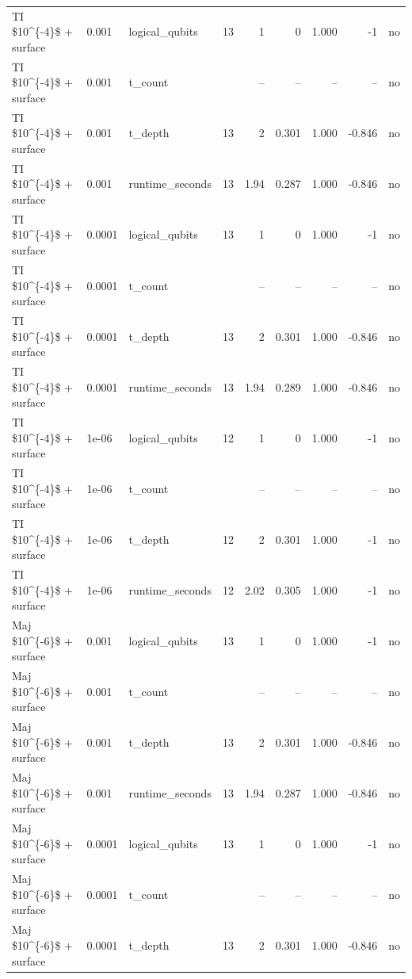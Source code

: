 \begin{tabular}{lllrrrrrl}
TI \$10\textasciicircum{}\{-4\}\$ + surface & 0.001 & logical\_qubits & 13 & 1 & 0 & 1.000 & -1 & no \\
TI \$10\textasciicircum{}\{-4\}\$ + surface & 0.001 & t\_count &  & -- & -- & -- & -- & no \\
TI \$10\textasciicircum{}\{-4\}\$ + surface & 0.001 & t\_depth & 13 & 2 & 0.301 & 1.000 & -0.846 & no \\
TI \$10\textasciicircum{}\{-4\}\$ + surface & 0.001 & runtime\_seconds & 13 & 1.94 & 0.287 & 1.000 & -0.846 & no \\
TI \$10\textasciicircum{}\{-4\}\$ + surface & 0.0001 & logical\_qubits & 13 & 1 & 0 & 1.000 & -1 & no \\
TI \$10\textasciicircum{}\{-4\}\$ + surface & 0.0001 & t\_count &  & -- & -- & -- & -- & no \\
TI \$10\textasciicircum{}\{-4\}\$ + surface & 0.0001 & t\_depth & 13 & 2 & 0.301 & 1.000 & -0.846 & no \\
TI \$10\textasciicircum{}\{-4\}\$ + surface & 0.0001 & runtime\_seconds & 13 & 1.94 & 0.289 & 1.000 & -0.846 & no \\
TI \$10\textasciicircum{}\{-4\}\$ + surface & 1e-06 & logical\_qubits & 12 & 1 & 0 & 1.000 & -1 & no \\
TI \$10\textasciicircum{}\{-4\}\$ + surface & 1e-06 & t\_count &  & -- & -- & -- & -- & no \\
TI \$10\textasciicircum{}\{-4\}\$ + surface & 1e-06 & t\_depth & 12 & 2 & 0.301 & 1.000 & -1 & no \\
TI \$10\textasciicircum{}\{-4\}\$ + surface & 1e-06 & runtime\_seconds & 12 & 2.02 & 0.305 & 1.000 & -1 & no \\
Maj \$10\textasciicircum{}\{-6\}\$ + surface & 0.001 & logical\_qubits & 13 & 1 & 0 & 1.000 & -1 & no \\
Maj \$10\textasciicircum{}\{-6\}\$ + surface & 0.001 & t\_count &  & -- & -- & -- & -- & no \\
Maj \$10\textasciicircum{}\{-6\}\$ + surface & 0.001 & t\_depth & 13 & 2 & 0.301 & 1.000 & -0.846 & no \\
Maj \$10\textasciicircum{}\{-6\}\$ + surface & 0.001 & runtime\_seconds & 13 & 1.94 & 0.287 & 1.000 & -0.846 & no \\
Maj \$10\textasciicircum{}\{-6\}\$ + surface & 0.0001 & logical\_qubits & 13 & 1 & 0 & 1.000 & -1 & no \\
Maj \$10\textasciicircum{}\{-6\}\$ + surface & 0.0001 & t\_count &  & -- & -- & -- & -- & no \\
Maj \$10\textasciicircum{}\{-6\}\$ + surface & 0.0001 & t\_depth & 13 & 2 & 0.301 & 1.000 & -0.846 & no \\

\end{tabular}
